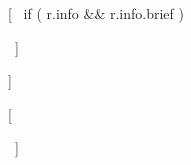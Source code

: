 [~ if ( r.info && r.info.brief ) { ~]

\vspace{12pt}
\begin{cvparagraph}
[[ r.info.brief ]]
\end{cvparagraph}
[~ } ~]
